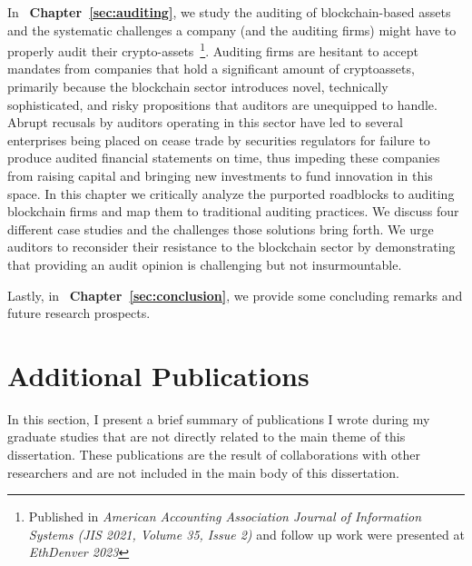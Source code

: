 In ~\textbf{Chapter~\ref{sec:auditing}}, we study the auditing of blockchain-based assets and the systematic challenges a company (and the auditing firms) might have to properly audit their crypto-assets~\cite{pimentel2021systemizing}\footnote{Published in \textit{American Accounting Association Journal of Information Systems (JIS 2021, Volume 35, Issue 2)} and follow up work were presented at \textit{EthDenver 2023}}. Auditing firms are hesitant to accept mandates from companies that hold a significant amount of cryptoassets, primarily because the blockchain sector introduces novel, technically sophisticated, and risky propositions that auditors are unequipped to handle. Abrupt recusals by auditors operating in this sector have led to several enterprises being placed on cease trade by securities regulators for failure to produce audited financial statements on time, thus impeding these companies from raising capital and bringing new investments to fund innovation in this space. In this chapter we critically analyze the purported roadblocks to auditing blockchain firms and map them to traditional auditing practices. We discuss four different case studies and the challenges those solutions bring forth. We urge auditors to reconsider their resistance to the blockchain sector by demonstrating that providing an audit opinion is challenging but not insurmountable.

Lastly, in ~\textbf{Chapter~\ref{sec:conclusion}}, we provide some concluding remarks and future research prospects.

\section{Additional Publications}
In this section, I present a brief summary of publications I wrote during my graduate studies that are not directly related to the main theme of this dissertation. These publications are the result of collaborations with other researchers and are not included in the main body of this dissertation.


